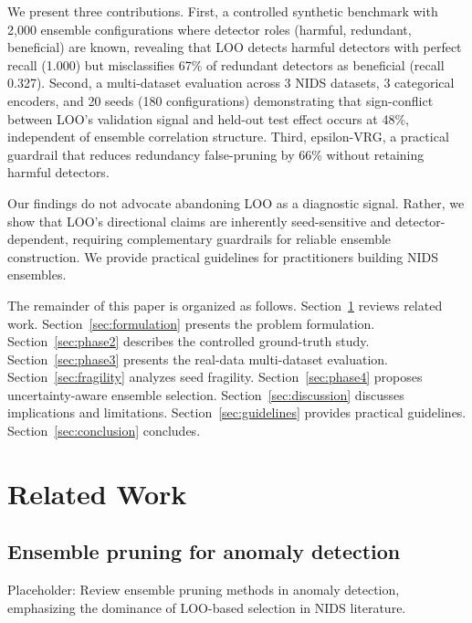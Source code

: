 \documentclass[preprint,12pt]{elsarticle}
\begin{document}
We present three contributions. First, a controlled synthetic benchmark with 2,000 ensemble configurations where detector roles (harmful, redundant, beneficial) are known, revealing that LOO detects harmful detectors with perfect recall (1.000) but misclassifies 67\% of redundant detectors as beneficial (recall 0.327). Second, a multi-dataset evaluation across 3 NIDS datasets, 3 categorical encoders, and 20 seeds (180 configurations) demonstrating that sign-conflict between LOO's validation signal and held-out test effect occurs at 48\%, independent of ensemble correlation structure. Third, epsilon-VRG, a practical guardrail that reduces redundancy false-pruning by 66\% without retaining harmful detectors.

Our findings do not advocate abandoning LOO as a diagnostic signal. Rather, we show that LOO's directional claims are inherently seed-sensitive and detector-dependent, requiring complementary guardrails for reliable ensemble construction. We provide practical guidelines for practitioners building NIDS ensembles.

The remainder of this paper is organized as follows. Section~\ref{sec:related} reviews related work. Section~\ref{sec:formulation} presents the problem formulation. Section~\ref{sec:phase2} describes the controlled ground-truth study. Section~\ref{sec:phase3} presents the real-data multi-dataset evaluation. Section~\ref{sec:fragility} analyzes seed fragility. Section~\ref{sec:phase4} proposes uncertainty-aware ensemble selection. Section~\ref{sec:discussion} discusses implications and limitations. Section~\ref{sec:guidelines} provides practical guidelines. Section~\ref{sec:conclusion} concludes.

\section{Related Work}
\label{sec:related}

\subsection{Ensemble pruning for anomaly detection}
Placeholder: Review ensemble pruning methods in anomaly detection, emphasizing the dominance of LOO-based selection in NIDS literature.
\end{document}
